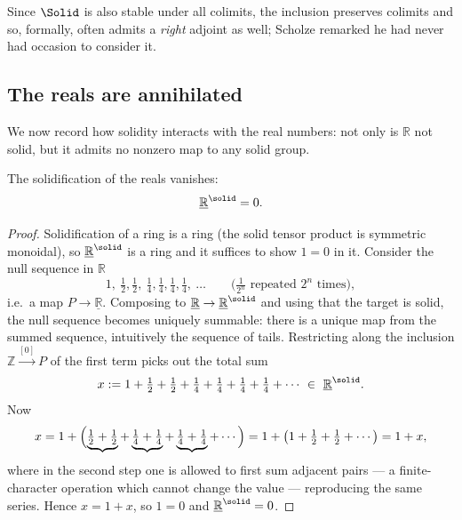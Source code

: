 \begin{remark}
\label{rmk:5:right-adjoint}
Since $\Solid$ is also stable under all colimits, the inclusion preserves
colimits and so, formally, often admits a \emph{right} adjoint as well; Scholze
remarked he had never had occasion to consider it.
\end{remark}

\subsection{The reals are annihilated}

We now record how solidity interacts with the real numbers: not only is
$\mathbb{R}$ not solid, but it admits no nonzero map to any solid group.

\begin{lemma}[$\mathbb{R}^{\solid}=0$]
\label{lem:5:R-solid-zero}
The solidification of the reals vanishes:
\begin{equation*}
\underline{\mathbb{R}}^{\solid}=0 .
\end{equation*}
\end{lemma}

\begin{proof}
Solidification of a ring is a ring (the solid tensor product is symmetric
monoidal), so $\underline{\mathbb{R}}^{\solid}$ is a ring and it suffices to show
$1=0$ in it. Consider the null sequence in $\mathbb{R}$
\begin{equation*}
1,\ \tfrac12,\tfrac12,\ \tfrac14,\tfrac14,\tfrac14,\tfrac14,\ \dots
\qquad\bigl(\tfrac{1}{2^{n}}\text{ repeated } 2^{n}\text{ times}\bigr),
\end{equation*}
i.e.\ a map $P\to\underline{\mathbb{R}}$. Composing to
$\underline{\mathbb{R}}\to\underline{\mathbb{R}}^{\solid}$ and using that the target
is solid, the null sequence becomes uniquely summable: there is a unique map from
the summed sequence, intuitively the sequence of tails. Restricting along the
inclusion $\mathbb{Z}\xrightarrow{[0]}P$ of the first term picks out the total sum
\begin{equation*}
x:=1+\tfrac12+\tfrac12+\tfrac14+\tfrac14+\tfrac14+\tfrac14+\cdots\ \in\
\underline{\mathbb{R}}^{\solid}.
\end{equation*}
Now
\begin{equation*}
x=1+\Bigl(\underbrace{\tfrac12+\tfrac12}+\underbrace{\tfrac14+\tfrac14}
+\underbrace{\tfrac14+\tfrac14}+\cdots\Bigr)
=1+\bigl(1+\tfrac12+\tfrac12+\cdots\bigr)=1+x ,
\end{equation*}
where in the second step one is allowed to first sum adjacent pairs --- a
finite-character operation which cannot change the value --- reproducing the same
series. Hence $x=1+x$, so $1=0$ and $\underline{\mathbb{R}}^{\solid}=0$.
\end{proof}

